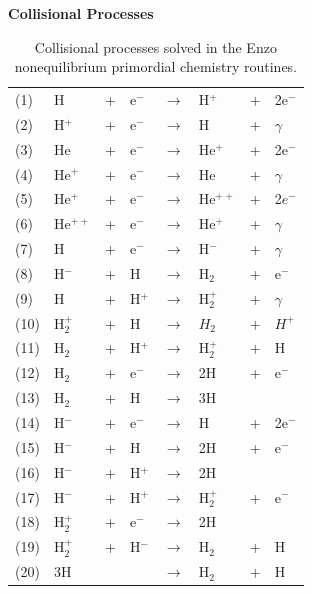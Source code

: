 \begin{table}
\begin{center}
{\bfseries Collisional Processes}\\[1ex]
\begin{tabular}{llllllll}
(1) & H & + & e$^-$ & $\rightarrow$ & H$^+$ &+& 2e$^-$ \\
(2) & H$^+$ &+ &e$^-$ & $\rightarrow$ & H &+ &$\gamma$ \\
(3) & He &+& e$^-$ & $\rightarrow$ & He$^+$ &+& 2e$^-$  \\
(4) & He$^+$ &+& e$^-$ & $\rightarrow$ & He &+ &$\gamma$  \\
(5) & He$^{+}$ &+& e$^-$ & $\rightarrow$ & He$^{++}$ &+& 2$e^-$  \\
(6) & He$^{++}$ &+& e$^-$ & $\rightarrow$ & He$^+$ &+& $\gamma$ \\
(7) & H &+& e$^-$ &$\rightarrow$& H$^-$ &+& $\gamma$  \\
(8) & H$^-$ &+& H &$\rightarrow$ & H$_2$ & +& e$^-$ \\
(9) & H &+ &H$^+$ &$\rightarrow$ &H$_2^+$ &+ &$\gamma$ \\
(10) & H$_2^+$ &+ &H &$\rightarrow$ &$H_2$ &+ &$H^+$ \\
(11) & H$_2$ &+ &H$^+$ &$\rightarrow$ &H$_2^+$ & +& H \\
(12) & H$_2$ &+ &e$^-$ & $\rightarrow$ & 2H & + & e$^-$  \\
(13) & H$_2$ & + & H & $\rightarrow$ & 3H &   &      \\
(14) & H$^-$ & + & e$^-$ & $\rightarrow$ & H & + & 2e$^-$ \\
(15) & H$^-$ & + & H & $\rightarrow$ & 2H & + & e$^-$ \\ 
(16) & H$^-$ & + & H$^+$ & $\rightarrow$ & 2H & & \\
(17) & H$^-$ & + & H$^+$ & $\rightarrow$ & H$_2^+$ & + & e$^-$ \\
(18) & H$_2^+$ & + & e$^-$ & $\rightarrow$ & 2H & & \\
(19) & H$_2^+$ & + & H$^-$ & $\rightarrow$ & H$_2$ & + & H  \\
(20) & 3H & & & $\rightarrow$ & H$_2$ & + & H
\end{tabular}
\caption[]{Collisional processes solved in the Enzo nonequilibrium
primordial chemistry routines.}
\label{table.collisional}
\end{center}
\end{table}



